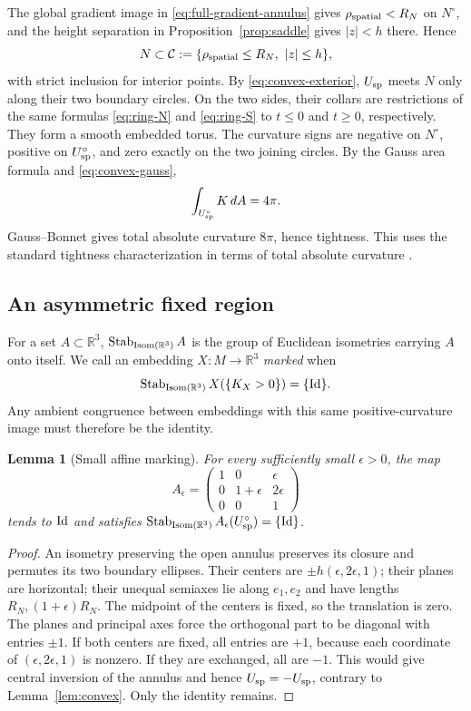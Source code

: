 \documentclass[11pt]{amsart}
\newtheorem{lemma}[theorem]{Lemma}
\theoremstyle{definition}
\theoremstyle{remark}
\newcommand{\R}{\mathbb R}\newcommand{\Sph}{\mathbb S}
\DeclareMathOperator{\Isom}{Isom}\DeclareMathOperator{\Emb}{Emb}
\numberwithin{equation}{section}
\begin{document}
The global gradient image in \eqref{eq:full-gradient-annulus} gives
$\rho_{\rm spatial}<R_N$ on $N^\circ$, and the height separation
in Proposition~\ref{prop:saddle} gives $|z|<h$ there. Hence
\[
 N\subset\mathcal C:=\{\rho_{\rm spatial}\le R_N,\ |z|\le h\},
\]
with strict inclusion for interior points. By
\eqref{eq:convex-exterior}, $U_{\rm sp}$ meets $N$ only along their
two boundary circles. On the two sides, their collars are restrictions
of the same formulas \eqref{eq:ring-N} and \eqref{eq:ring-S} to
$t\le0$ and $t\ge0$, respectively. They form a smooth embedded torus.
The curvature signs are negative on $N^\circ$, positive on
$U_{\rm sp}^\circ$, and zero exactly on the two joining circles.
By the Gauss area formula and \eqref{eq:convex-gauss},
\begin{equation}\label{eq:positive-integral}
 \int_{U_{\rm sp}^\circ}K\,dA=4\pi.
\end{equation}
Gauss--Bonnet gives total absolute curvature $8\pi$, hence
tightness. This uses the standard tightness characterization in
terms of total absolute curvature \cite{BK}.


\subsection{An asymmetric fixed region}
For a set $A\subset\R^3$,
$\Stab_{\Isom(\R^3)}A$ is the group of Euclidean isometries carrying
$A$ onto itself.
We call an embedding $X:M\to\R^3$ \emph{marked} when
\[
 \Stab_{\Isom(\R^3)}X(\{K_X>0\})=\{\Id\}.
\]
Any ambient congruence between embeddings with this same
positive-curvature image must therefore be the identity.

\begin{lemma}[Small affine marking]\label{lem:ellipses-new}
For every sufficiently small $\epsilon>0$, the map
\[
 A_\epsilon=\begin{pmatrix}
 1&0&\epsilon\\0&1+\epsilon&2\epsilon\\0&0&1
 \end{pmatrix}
\]
tends to $\mathrm{Id}$ and satisfies
$\Stab_{\Isom(\R^3)}A_\epsilon(U_{\rm sp}^\circ)=\{\Id\}$.
\end{lemma}
\begin{proof}
An isometry preserving the open annulus preserves its closure and permutes
its two boundary ellipses. Their centers are
$\pm h(\epsilon,2\epsilon,1)$; their planes are horizontal; their unequal
semiaxes lie along $e_1,e_2$ and have lengths $R_N,(1+\epsilon)R_N$.
The midpoint of the centers is fixed, so the translation is zero.
The planes and principal axes force the orthogonal part to be diagonal
with entries $\pm1$. If both centers are fixed, all entries are $+1$,
because each coordinate of $(\epsilon,2\epsilon,1)$ is nonzero.
If they are exchanged, all are $-1$. This would give central inversion
of the annulus and hence $U_{\rm sp}=-U_{\rm sp}$, contrary to
Lemma~\ref{lem:convex}. Only the identity remains.
\end{proof}
\end{document}
